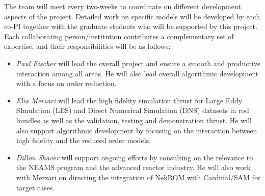 The team will meet every two-weeks to coordinate on different development
aspects of the project. Detailed work on specific models will be developed by
each co-PI together with the graduate students who will be supported by this
project. Each collaborating person/institution contributes a complementary set
of expertise, and their responsibilities will be as follows: 
\begin{itemize}
    \item \textit{Paul  Fischer} will  lead the overall project and ensure a
smooth and productive interaction among all areas. He will also lead overall
algorithmic development with a focus on order reduction.  

\item \textit{Elia Merzari} will lead the high fidelity simulation thrust
for Large Eddy SImulation (LES) and Direct Numerical Simulation (DNS) datasets
in rod bundles as well as the validation, testing and demonstration thrust. He
will also support algorithmic development by focusing on the interaction
between high fidelity and the reduced order models.

\item \textit{Dillon
Shaver} will support ongoing efforts by consulting on the relevance to the
NEAMS program and the advanced reactor industry.  He will also work with Merzari
on directing the integration of NekROM with Cardinal/SAM for target cases.
\end{itemize}

